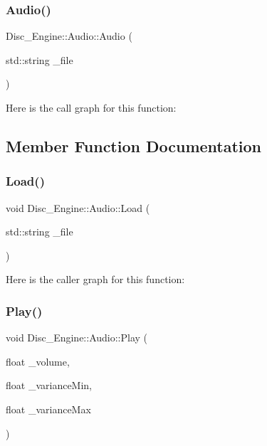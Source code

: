 \subsubsection{\texorpdfstring{Audio()}{Audio()}}
{\footnotesize\ttfamily Disc\+\_\+\+Engine\+::\+Audio\+::\+Audio (\begin{DoxyParamCaption}\item[{std\+::string}]{\+\_\+file }\end{DoxyParamCaption})}

Here is the call graph for this function\+:


\subsection{Member Function Documentation}
\mbox{\label{class_disc___engine_1_1_audio_af0738b4f4815eadcb3ed36a29e1601d3}} 
\subsubsection{\texorpdfstring{Load()}{Load()}}
{\footnotesize\ttfamily void Disc\+\_\+\+Engine\+::\+Audio\+::\+Load (\begin{DoxyParamCaption}\item[{std\+::string}]{\+\_\+file }\end{DoxyParamCaption})}

Here is the caller graph for this function\+:
\mbox{\label{class_disc___engine_1_1_audio_ac5d1489aec521a97badd977d5eb93247}} 
\subsubsection{\texorpdfstring{Play()}{Play()}\hspace{0.1cm}{\footnotesize\ttfamily [1/2]}}
{\footnotesize\ttfamily void Disc\+\_\+\+Engine\+::\+Audio\+::\+Play (\begin{DoxyParamCaption}\item[{float}]{\+\_\+volume,  }\item[{float}]{\+\_\+variance\+Min,  }\item[{float}]{\+\_\+variance\+Max }\end{DoxyParamCaption})}


